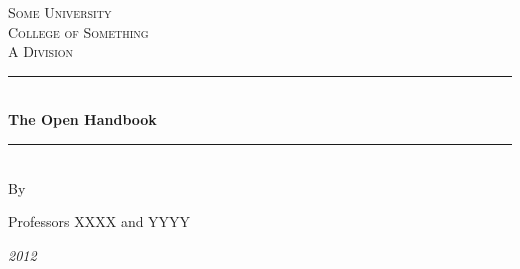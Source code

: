 \documentclass[12pt, hidelinks]{article} %
\begin{document}

\begin{titlepage}

\newcommand{\HRule}{\rule{\linewidth}{0.3mm}} %

\center %

\textsc{\LARGE Some University}\\[1.5cm] %
\textsc{\Large College of Something}\\[0.5cm] %
\textsc{\large A Division}\\[0.5cm] %

\HRule \\[0.4cm]
{ \huge \bfseries The Open Handbook}\\[0.4cm] %
\HRule \\[1.5cm]

By

Professors XXXX and YYYY



\vfill %
\emph{2012}\\[.5cm] 
\end{titlepage}


\tableofcontents %

\newpage %

\end{document}
